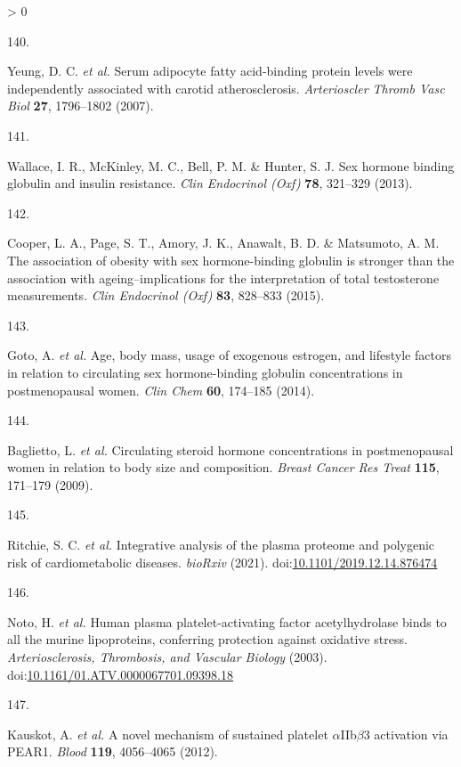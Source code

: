 \documentclass[11pt,twoside]{bristolthesis}
\newlength{\cslhangindent}
\newlength{\csllabelwidth}
\newenvironment{CSLReferences}[2] %
 {%
  \setlength{\parindent}{0pt}
  \ifodd #1 \everypar{\setlength{\hangindent}{\cslhangindent}}\ignorespaces\fi
  \ifnum #2 > 0
  \setlength{\parskip}{#2\baselineskip}
  \fi
 }%
 {}
\newcommand{\CSLLeftMargin}[1]{\parbox[t]{\csllabelwidth}{#1}}
\newcommand{\CSLRightInline}[1]{\parbox[t]{\linewidth - \csllabelwidth}{#1}\break}
\begin{document}
\begin{CSLReferences}{0}{0}
\leavevmode\hypertarget{ref-Yeung2007}{}%
\CSLLeftMargin{140. }
\CSLRightInline{Yeung, D. C. \emph{et al.} {Serum adipocyte fatty acid-binding protein levels were independently associated with carotid atherosclerosis}. \emph{Arterioscler Thromb Vasc Biol} \textbf{27}, 1796--1802 (2007).}

\leavevmode\hypertarget{ref-Wallace2013}{}%
\CSLLeftMargin{141. }
\CSLRightInline{Wallace, I. R., McKinley, M. C., Bell, P. M. \& Hunter, S. J. {Sex hormone binding globulin and insulin resistance}. \emph{Clin Endocrinol (Oxf)} \textbf{78}, 321--329 (2013).}

\leavevmode\hypertarget{ref-Cooper2015}{}%
\CSLLeftMargin{142. }
\CSLRightInline{Cooper, L. A., Page, S. T., Amory, J. K., Anawalt, B. D. \& Matsumoto, A. M. {The association of obesity with sex hormone-binding globulin is stronger than the association with ageing--implications for the interpretation of total testosterone measurements}. \emph{Clin Endocrinol (Oxf)} \textbf{83}, 828--833 (2015).}

\leavevmode\hypertarget{ref-Goto2014}{}%
\CSLLeftMargin{143. }
\CSLRightInline{Goto, A. \emph{et al.} {Age, body mass, usage of exogenous estrogen, and lifestyle factors in relation to circulating sex hormone-binding globulin concentrations in postmenopausal women}. \emph{Clin Chem} \textbf{60}, 174--185 (2014).}

\leavevmode\hypertarget{ref-Baglietto2009}{}%
\CSLLeftMargin{144. }
\CSLRightInline{Baglietto, L. \emph{et al.} {Circulating steroid hormone concentrations in postmenopausal women in relation to body size and composition}. \emph{Breast Cancer Res Treat} \textbf{115}, 171--179 (2009).}

\leavevmode\hypertarget{ref-Ritchie2019}{}%
\CSLLeftMargin{145. }
\CSLRightInline{Ritchie, S. C. \emph{et al.} {Integrative analysis of the plasma proteome and polygenic risk of cardiometabolic diseases}. \emph{bioRxiv} (2021). doi:\href{https://doi.org/10.1101/2019.12.14.876474}{10.1101/2019.12.14.876474}}

\leavevmode\hypertarget{ref-Noto2003}{}%
\CSLLeftMargin{146. }
\CSLRightInline{Noto, H. \emph{et al.} {Human plasma platelet-activating factor acetylhydrolase binds to all the murine lipoproteins, conferring protection against oxidative stress}. \emph{Arteriosclerosis, Thrombosis, and Vascular Biology} (2003). doi:\href{https://doi.org/10.1161/01.ATV.0000067701.09398.18}{10.1161/01.ATV.0000067701.09398.18}}

\leavevmode\hypertarget{ref-Kauskot2012}{}%
\CSLLeftMargin{147. }
\CSLRightInline{Kauskot, A. \emph{et al.} {A novel mechanism of sustained platelet \(\alpha\)IIb\(\beta\)3 activation via PEAR1.} \emph{Blood} \textbf{119}, 4056--4065 (2012).}


\end{CSLReferences}
\end{document}

